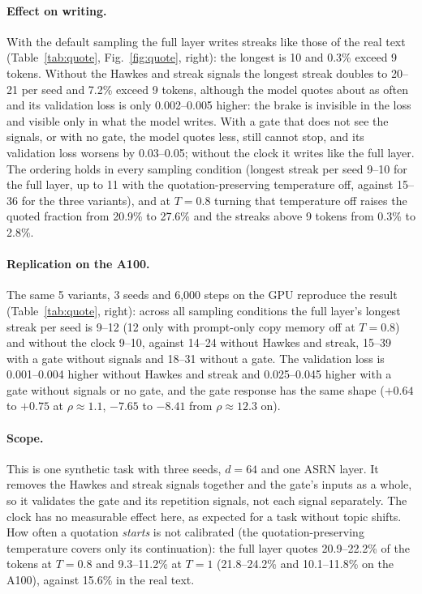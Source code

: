 \paragraph{Effect on writing.} With the default sampling the full layer writes streaks like those of the real text
(Table~\ref{tab:quote}, Fig.~\ref{fig:quote}, right): the longest is 10 and 0.3\% exceed 9 tokens. Without the Hawkes
and streak signals the longest streak doubles to 20--21 per seed and 7.2\% exceed 9 tokens, although the model quotes
about as often and its validation loss is only 0.002--0.005 higher: the brake is invisible in the loss and visible only
in what the model writes. With a gate that does not see the signals, or with no gate, the model quotes less, still
cannot stop, and its validation loss worsens by 0.03--0.05; without the clock it writes like the full layer. The
ordering holds in every sampling condition (longest streak per seed 9--10 for the full layer, up to 11 with the
quotation-preserving temperature off, against 15--36 for the three variants), and at $T=0.8$ turning that temperature
off raises the quoted fraction from 20.9\% to 27.6\% and the streaks above 9 tokens from 0.3\% to 2.8\%.

\paragraph{Replication on the A100.} The same 5 variants, 3 seeds and 6{,}000 steps on the GPU reproduce the result
(Table~\ref{tab:quote}, right): across all sampling conditions the full layer's longest streak per seed is 9--12 (12
only with prompt-only copy memory off at $T=0.8$) and without the clock 9--10, against 14--24 without Hawkes and streak,
15--39 with a gate without signals and 18--31 without a gate. The validation loss is 0.001--0.004 higher without Hawkes
and streak and 0.025--0.045 higher with a gate without signals or no gate, and the gate response has the same shape
($+0.64$ to $+0.75$ at $\rho\approx1.1$, $-7.65$ to $-8.41$ from $\rho\approx12.3$ on).

\paragraph{Scope.} This is one synthetic task with three seeds, $d=64$ and one ASRN layer. It removes the Hawkes and
streak signals together and the gate's inputs as a whole, so it validates the gate and its repetition signals, not each
signal separately. The clock has no measurable effect here, as expected for a task without topic shifts. How often a
quotation \emph{starts} is not calibrated (the quotation-preserving temperature covers only its continuation): the full
layer quotes 20.9--22.2\% of the tokens at $T=0.8$ and 9.3--11.2\% at $T=1$ (21.8--24.2\% and 10.1--11.8\% on the
A100), against 15.6\% in the real text.

